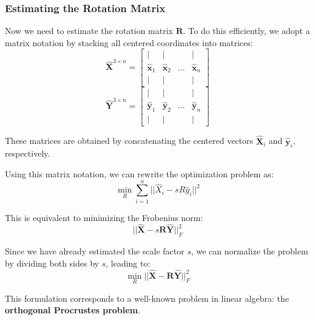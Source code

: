 \documentclass[11pt,a4paper]{article}
\theoremstyle{definition}
\theoremstyle{plain}
\theoremstyle{remark}
\begin{document}
\subsubsection{Estimating the Rotation Matrix}\label{subsubsec:estimating_rotation}

Now we need to estimate the rotation matrix $\mathbf{R}$. To do this efficiently, we adopt a matrix notation by stacking all centered coordinates into matrices:
\begin{equation} \nonumber
    \hat{\mathbf{X}}^{3 \times n} = \begin{bmatrix}
    \vert & \vert & & \vert \\
    \hat{\mathbf{x}}_1 & \hat{\mathbf{x}}_2 & \dots & \hat{\mathbf{x}}_n \\
    \vert & \vert & & \vert
    \end{bmatrix}
\end{equation}
\begin{equation} \nonumber
    \hat{\mathbf{Y}}^{3 \times n} = \begin{bmatrix}
    \vert & \vert & & \vert \\
    \hat{\mathbf{y}}_1 & \hat{\mathbf{y}}_2 & \dots & \hat{\mathbf{y}}_n \\
    \vert & \vert & & \vert
    \end{bmatrix}
\end{equation}

These matrices are obtained by concatenating the centered vectors $\hat{\mathbf{X}}_i$ and $\hat{\mathbf{y}}_i$, respectively.

Using this matrix notation, we can rewrite the optimization problem as:
\begin{equation} \nonumber
    \min_{R} \sum_{i=1}^{n} ||\hat{X}_i - s R \hat{y}_i||^2
\end{equation}

This is equivalent to minimizing the Frobenius norm:
\begin{equation} \nonumber
    ||\hat{\mathbf{X}} - s \mathbf{R} \hat{\mathbf{Y}} ||_F^2
\end{equation}

Since we have already estimated the scale factor $s$, we can normalize the problem by dividing both sides by $s$, leading to:
\begin{equation} \nonumber
    \min_{R} ||\hat{\mathbf{X}} - \mathbf{R} \hat{\mathbf{Y}} ||_F^2
\end{equation}

This formulation corresponds to a well-known problem in linear algebra: the \textbf{orthogonal Procrustes problem}.
\end{document}
